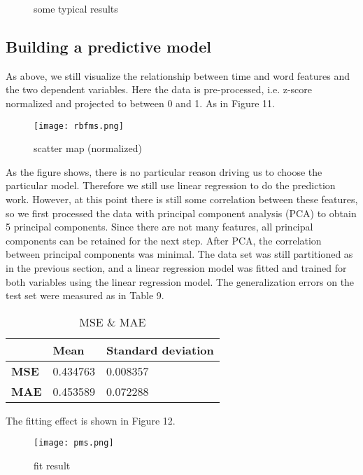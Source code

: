 \documentclass[12pt]{article}  %
\begin{document}
\begin{figure}[H]
	\centering    
	\caption{some typical results}		%
	\label{img33}									%
\end{figure}


\subsection{Building a predictive model} 
As above, we still visualize the relationship between time and word features and the two dependent variables. Here the data is pre-processed, i.e. z-score normalized and projected to between 0 and 1. As in Figure 11.
\begin{figure}[H]
	\centering
	\texttt{[image: rbfms.png]}
	\label{img30}
	\caption{scatter map (normalized)}
\end{figure}
As the figure shows, there is no particular reason driving us to choose the particular model. Therefore we still use linear regression to do the prediction work. However, at this point there is still some correlation between these features, so we first processed the data with principal component analysis (PCA) to obtain 5 principal components. Since there are not many features, all principal components can be retained for the next step. After PCA, the correlation between principal components was minimal.
The data set was still partitioned as in the previous section, and a linear regression model was fitted and trained for both variables using the linear regression model. The generalization errors on the test set were measured as in Table 9.
\begin{table}[!ht]
    \centering
    \begin{tabular}{|l|l|l|}
    \hline
        \textbf{} & \textbf{Mean} & \textbf{Standard deviation} \\ \hline
        \textbf{MSE} & 0.434763 & 0.008357 \\ \hline
        \textbf{MAE} & 0.453589 & 0.072288 \\ \hline

    \end{tabular}
	\caption{MSE \& MAE}
\end{table}
The fitting effect is shown in Figure 12.
\begin{figure}[H]
	\centering
	\texttt{[image: pms.png]}
	\label{img31}
	\caption{fit result}
\end{figure}
\end{document}
